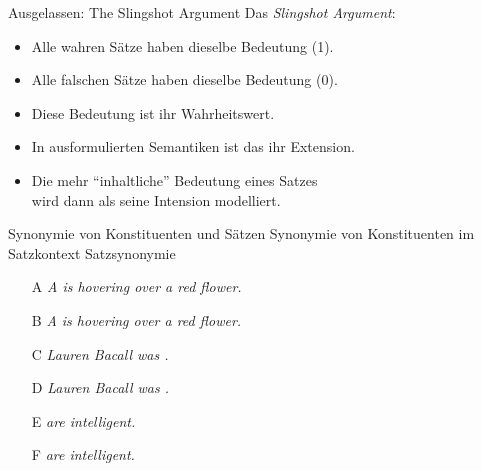 \begin{frame}
  {Ausgelassen: The Slingshot Argument}
  \onslide<+->
  \onslide<+->
  Das \textit{Slingshot Argument}:
  \begin{itemize}[<+->]
    \item Alle wahren Sätze haben dieselbe Bedeutung (1).
    \item Alle falschen Sätze haben dieselbe Bedeutung (0).
    \item Diese Bedeutung ist ihr \alert{Wahrheitswert}.
    \item In ausformulierten Semantiken ist das ihr \alert{Extension}.
    \item Die mehr ``inhaltliche'' Bedeutung eines Satzes\\
      wird dann als seine \alert{Intension} modelliert.
  \end{itemize}
  \Halbzeile
  \centering 
  \onslide<+->
\end{frame}

\begin{frame}
  {Synonymie von Konstituenten und Sätzen}
  Synonymie von Konstituenten im Satzkontext  Satzsynonymie\\
  \onslide<+->
  \Halbzeile
  \begin{itemize}[<+->]
    \item[A] \alert{\textit{A  is hovering over a red flower.}}
    \item[B] \alert{\textit{A  is hovering over a red flower.}}
    \item[ ] 
    \item[ ] 
      \Halbzeile
    \item[C] \alert{\textit{Lauren Bacall was .}}
    \item[D] \alert{\textit{Lauren Bacall was .}}
    \item[ ] 
      \Halbzeile
    \item[E] \alert{\textit{ are intelligent.}}
    \item[F] \alert{\textit{ are intelligent.}}
    \item[ ] 
  \end{itemize}
\end{frame}

